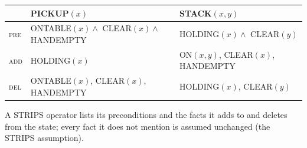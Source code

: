 \begin{center}
\renewcommand{\arraystretch}{1.3}
\begin{tabular}{@{}l l l@{}}
\toprule
& \textbf{PICKUP}$(x)$ & \textbf{STACK}$(x, y)$ \\
\midrule
\textsc{pre} & ONTABLE$(x) \wedge$ CLEAR$(x) \wedge$ HANDEMPTY & HOLDING$(x) \wedge$ CLEAR$(y)$ \\
\textsc{add} & HOLDING$(x)$ & ON$(x, y)$, CLEAR$(x)$, HANDEMPTY \\
\textsc{del} & ONTABLE$(x)$, CLEAR$(x)$, HANDEMPTY & HOLDING$(x)$, CLEAR$(y)$ \\
\bottomrule
\end{tabular}
\end{center}
\noindent A STRIPS operator lists its preconditions and the facts it adds to and deletes from the state; every fact
it does not mention is assumed unchanged (the STRIPS assumption).
